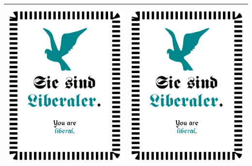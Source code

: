 \documentclass[12pt,a4paper,spanish]{article}
\begin{document}
\begin{table}
\begin{tabular}{|c|c|}
			\midrule
			\includegraphics[height=8.7cm, angle=90]{./Drawings/role_liberal.pdf} &
			\includegraphics[height=8.7cm, angle=90]{./Drawings/role_liberal.pdf} \\
			\bottomrule
		\end{tabular}
	\end{table}

	\newpage
	
\end{document}
